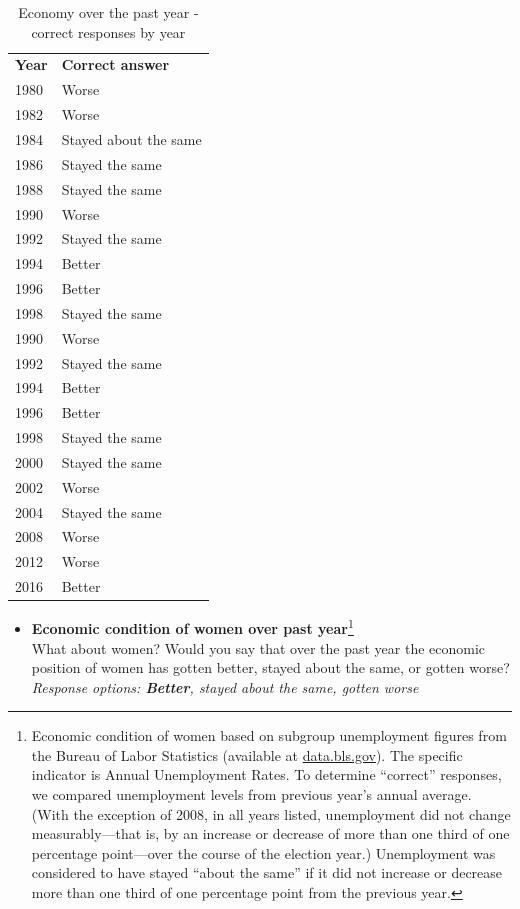 \documentclass[12pt, letterpaper]{article}
\begin{document}
{\begin{itemize}
\begin{table}[H]
\centering
\caption{Economy over the past year - correct responses by year}
\vspace{.1in}
\label{econ_corr_by_year}
\begin{tabular}{ll}
\textbf{Year} & \textbf{Correct answer}       \\
1980 & Worse                 \\
1982 & Worse                 \\
1984 & Stayed about the same \\
1986 & Stayed the same \\
1988 & Stayed the same \\
1990 & Worse                 \\
1992 & Stayed the same \\
1994 & Better                \\
1996 & Better                \\
1998 & Stayed the same \\
1990 & Worse                 \\
1992 & Stayed the same \\
1994 & Better                \\
1996 & Better                \\
1998 & Stayed the same \\
2000 & Stayed the same \\
2002 & Worse                 \\
2004 & Stayed the same \\
2008 & Worse                 \\
2012 & Worse                 \\
2016 & Better               
\end{tabular}
\end{table}

   \end{itemize}}

\clearpage
\large {}

\begin{itemize}
\normalsize
\item \textbf{Economic condition of women over past year}\footnote{Economic condition of women based on subgroup unemployment figures from the Bureau of Labor Statistics (available at \url{data.bls.gov}). The specific indicator is Annual Unemployment Rates. To determine ``correct'' responses, we compared unemployment levels from previous year's annual average. (With the exception of 2008, in all years listed, unemployment did not change measurably---that is, by an increase or decrease of more than one third of one percentage point---over the course of the election year.) Unemployment was considered to have stayed ``about the same'' if it did not increase or decrease more than one third of one percentage point from the previous year.}   \\
What about women? Would you say that over the past year the economic position of women has gotten better, stayed about the same, or gotten worse? 
\textit{Response options: \textbf{Better}, stayed about the same, gotten worse} 
\end{itemize}
\end{document}
